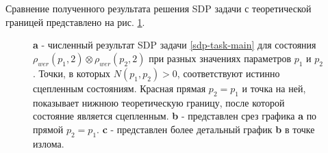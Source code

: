 Сравнение полученного результата решения  SDP задачи с теоретической границей представлено на рис. \ref{img:2-werner-compare}.
\begin{figure}
    \caption{
    \textbf{a} - численный результат SDP задачи \ref{sdp-task-main} для состояния $\rho_{wer}(p_1,2) \otimes \rho_{wer}(p_2,2)$ при разных значениях параметров $p_1$ и $p_2$. Точки, в которых $N(p_1, p_2) > 0$, соответствуют истинно сцепленным состояниям. Красная прямая $p_2 = p_1$ и точка на ней, показывает нижнюю теоретическую границу, после которой состояние является сцепленным.
    \textbf{b} - представлен срез графика \textbf{a} по прямой $p_2 = p_1$.
    \textbf{c} - представлен более детальный график \textbf{b} в точке излома.}
    \label{img:2-werner-compare}
\end{figure}